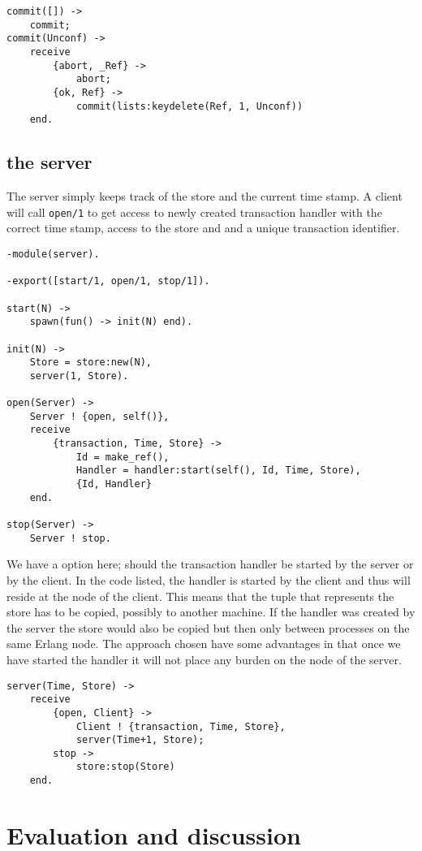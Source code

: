 \documentclass[a4paper, 11pt]{article}
\begin{document}
\begin{verbatim}
commit([]) ->
    commit;
commit(Unconf) ->
    receive
        {abort, _Ref} ->
            abort;
        {ok, Ref} ->
            commit(lists:keydelete(Ref, 1, Unconf))
    end.
\end{verbatim}


\subsection{the server}

The server simply keeps track of the store and the current time
stamp. A client will call {\tt open/1} to get access to newly created
transaction handler with the correct time stamp, access to the store
and and a unique transaction identifier.

\begin{verbatim}
-module(server).

-export([start/1, open/1, stop/1]).

start(N) ->
    spawn(fun() -> init(N) end).

init(N) ->
    Store = store:new(N),
    server(1, Store).

open(Server) ->
    Server ! {open, self()},
    receive
        {transaction, Time, Store} ->
            Id = make_ref(),
            Handler = handler:start(self(), Id, Time, Store),
            {Id, Handler}
    end.

stop(Server) ->
    Server ! stop.
\end{verbatim}

We have a option here; should the transaction handler be started by
the server or by the client. In the code listed, the handler is started
by the client and thus will reside at the node of the client. This
means that the tuple that represents the store has to be copied,
possibly to another machine. If the handler was created by the server
the store would also be copied but then only between processes on the
same Erlang node. The approach chosen have some advantages in that once
we have started the handler it will not place any burden on the node of
the server. 

\begin{verbatim}
server(Time, Store) ->
    receive 
        {open, Client} ->
            Client ! {transaction, Time, Store},
            server(Time+1, Store);
        stop ->
            store:stop(Store)
    end.
\end{verbatim}

\section{Evaluation and discussion}
\end{document}
